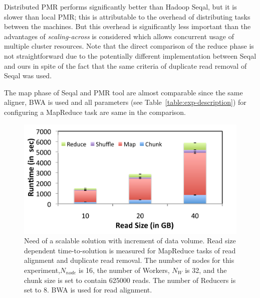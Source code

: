 \documentclass{acm_proc_article-sp}
\begin{document}
Distributed PMR performs significantly better than Hadoop Seqal, but
it is slower than local PMR; this is attributable to the overhead of
distributing tasks between the machines.  But this overhead is
significantly less important than the advantages of
\textit{scaling-across} is considered which allows concurrent usage of
multiple cluster resources. Note that the direct comparison of the
reduce phase is not straightforward due to the potentially different
implementation between Seqal and ours   in spite of the fact that the same
criteria of duplicate read removal of Seqal\cite{seal_2011_mapred} was
used.

The map phase of Seqal and PMR tool are almost comparable since
the same aligner, BWA is used and all parameters (see
Table~\ref{table:exp-description}) for configuring a MapReduce task
are same in the comparison.


 \begin{figure}
 \centering
\includegraphics[scale=0.50]{figures/pj-smr-tts.pdf} 
\caption{\small Need of a scalable solution with increment of data
  volume.  Read size dependent time-to-solution is measured for
  MapReduce tasks of read alignment and duplicate read removal.  The
  number of nodes for this experiment,$N_{node}$ is 16, the number of
  Workers, $N_W$ is 32, and the chunk size is set to contain 625000
  reads.  The number of Reducers is set to 8. BWA is used for read
  alignment.}
  \label{fig:read-size} 
\end{figure}
\end{document}
